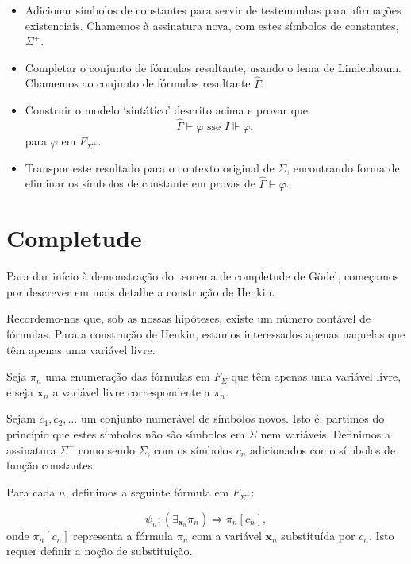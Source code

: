 \documentclass{report}
\theoremstyle{definition}
\theoremstyle{remark}
\renewcommand{\bf}[1]{\mathbf{#1}}
\newcommand{\imply}{\mathbin{\Rightarrow}}
\begin{document}
	\begin{itemize}
	\item Adicionar símbolos de constantes para servir de testemunhas para afirmações existenciais. Chamemos à assinatura nova, com estes símbolos de constantes, $\Sigma^+$.
	
	\item Completar o conjunto de fórmulas resultante, usando o lema de Lindenbaum. Chamemos ao conjunto de fórmulas resultante $\widehat\Gamma$.
	
	\item Construir o modelo `sintático' descrito acima e provar que
	\[\widehat\Gamma \vdash \varphi \text{ sse } I \Vdash \varphi,\]
	para $\varphi$ em $F_{\Sigma^+}$.
	
	\item Transpor este resultado para o contexto original de $\Sigma$, encontrando forma de eliminar os símbolos de constante em provas de $\widehat\Gamma \vdash \varphi$.
	\end{itemize}
	
	\section{Completude}
	
	Para dar início à demonstração do teorema de completude de Gödel, começamos por descrever em mais detalhe a construção de Henkin.
	
	Recordemo-nos que, sob as nossas hipóteses, existe um número contável de fórmulas. Para a construção de Henkin, estamos interessados apenas naquelas que têm apenas uma variável livre.
	
	Seja $\pi_n$ uma enumeração das fórmulas em $F_\Sigma$ que têm apenas uma variável livre, e seja $\bf x_n$ a variável livre correspondente a $\pi_n$.
	
	Sejam $c_1, c_2, \dots$ um conjunto numerável de símbolos novos. Isto é, partimos do princípio que estes símbolos não são símbolos em $\Sigma$ nem variáveis. Definimos a assinatura $\Sigma^+$ como sendo $\Sigma$, com os símbolos $c_n$ adicionados como símbolos de função constantes.
	
	Para cada $n$, definimos a seguinte fórmula em $F_{\Sigma^+}$:
	
	\[\psi_n : (\exists_{\bf x_n} \pi_n) \imply \pi_n[c_n],\]
	onde $\pi_n[c_n]$ representa a fórmula $\pi_n$ com a variável $\bf x_n$ substituída por $c_n$. Isto requer definir a noção de substituição.
	
\end{document}
